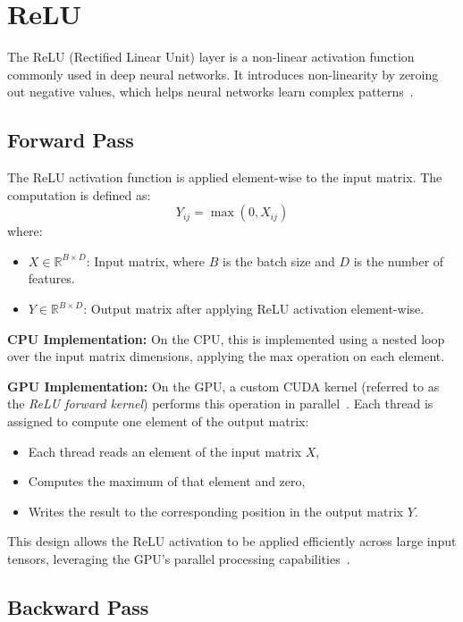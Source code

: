\section{ReLU}

The ReLU (Rectified Linear Unit) layer is a non-linear activation function commonly used in deep neural networks. It introduces non-linearity by zeroing out negative values, which helps neural networks learn complex patterns~\cite{nair2010rectified, goodfellow2016deep}.

\subsection{Forward Pass}

The ReLU activation function is applied element-wise to the input matrix. The computation is defined as:
\[
    Y_{ij} = \max(0, X_{ij})
\]
where:
\begin{itemize}
    \item \( X \in \mathbb{R}^{B \times D} \): Input matrix, where \( B \) is the batch size and \( D \) is the number of features.
    \item \( Y \in \mathbb{R}^{B \times D} \): Output matrix after applying ReLU activation element-wise.
\end{itemize}

\textbf{CPU Implementation:}  
On the CPU, this is implemented using a nested loop over the input matrix dimensions, applying the max operation on each element.

\textbf{GPU Implementation:}  
On the GPU, a custom CUDA kernel (referred to as the \textit{ReLU forward kernel}) performs this operation in parallel~\cite{nvidia_cudnn}. Each thread is assigned to compute one element of the output matrix:
\begin{itemize}
    \item Each thread reads an element of the input matrix \( X \),
    \item Computes the maximum of that element and zero,
    \item Writes the result to the corresponding position in the output matrix \( Y \).
\end{itemize}

This design allows the ReLU activation to be applied efficiently across large input tensors, leveraging the GPU's parallel processing capabilities~\cite{digitalocean_gpu_opt}.

\subsection{Backward Pass}


